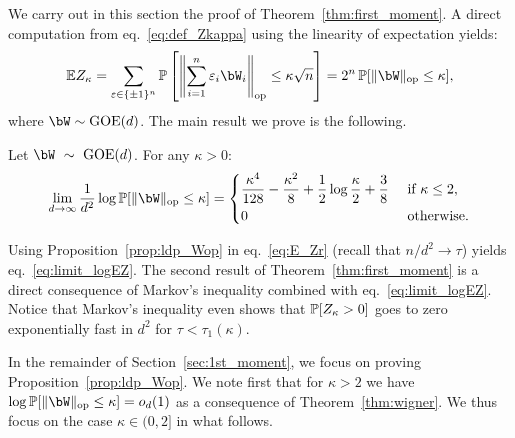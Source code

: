 We carry out in this section the proof of Theorem~\ref{thm:first_moment}.
A direct computation from eq.~\eqref{eq:def_Zkappa} using the linearity of expectation yields:
\begin{equation}
    \label{eq:E_Zr}
    \EE Z_\kappa = \sum_{\eps \in \{\pm 1\}^n} \bbP\left[\left\|\sum_{i=1}^n \eps_i \bW_i\right\|_{\op} \leq \kappa \sqrt{n}\right] = 2^n \, \bbP[\|\bW\|_\op \leq \kappa],
\end{equation}
where $\bW \sim \GOE(d)$.
The main result we prove is the following.
\begin{proposition}
    \label{prop:ldp_Wop}
    Let $\bW~\sim~\GOE(d)$. For any $\kappa > 0$:
    \begin{equation}
        \label{eq:ldp_Wop}
        \lim_{d \to \infty} \frac{1}{d^2} \log \bbP[\|\bW\|_\op \leq \kappa]
        = 
        \begin{dcases}
            \frac{\kappa^4}{128} - \frac{\kappa^2}{8} + \frac{1}{2} \log \frac{\kappa}{2} + \frac{3}{8} &\textrm{ if } \kappa \leq 2, \\
            0 &\textrm{ otherwise.} 
        \end{dcases}
    \end{equation}
\end{proposition}
\noindent
Using Proposition~\ref{prop:ldp_Wop} in eq.~\eqref{eq:E_Zr} (recall that $n/d^2 \to \tau$) yields eq.~\eqref{eq:limit_logEZ}.
The second result of Theorem~\ref{thm:first_moment} is a direct consequence of Markov's inequality combined with eq.~\eqref{eq:limit_logEZ}.
Notice that Markov's inequality even shows that $\mathbb{P}[Z_\kappa > 0]$ goes to zero exponentially fast in $d^2$ for $\tau < \tau_1(\kappa)$.

\myskip 
In the remainder of Section~\ref{sec:1st_moment}, we focus on proving Proposition~\ref{prop:ldp_Wop}.
We note first that for $\kappa > 2$ we have $\log \bbP[\|\bW\|_\op \leq \kappa] = \smallO_d(1)$ as a consequence of Theorem~\ref{thm:wigner}. 
We thus focus on the case $\kappa \in (0,2]$ in what follows.

